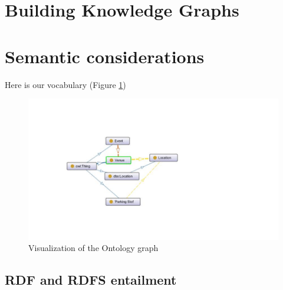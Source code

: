 \documentclass[runningheads,a4paper]{../../StyleFiles/llncs}
\begin{document}
\section{Building Knowledge Graphs}

\section{Semantic considerations}
Here is our vocabulary (Figure \ref{fig:ontology})

\begin{figure}[h]
	\centering
	\includegraphics[width=1\textwidth]{img/ontology.jpg}
	\caption{Visualization of the Ontology graph}
	\label{fig:ontology}
\end{figure}

\subsection{RDF and RDFS entailment}
\end{document}
